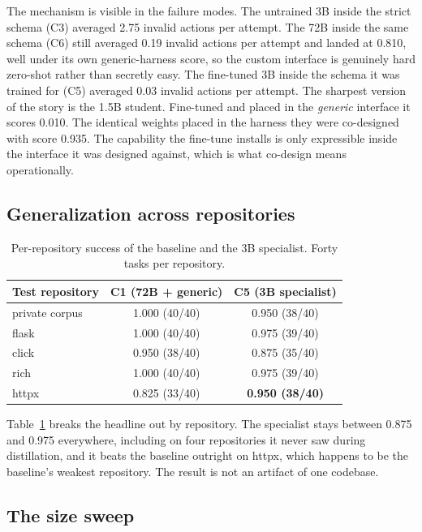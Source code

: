 \documentclass[11pt]{article}
\begin{document}
The mechanism is visible in the failure modes. The untrained 3B inside the
strict schema (C3) averaged 2.75 invalid actions per attempt. The 72B inside
the same schema (C6) still averaged 0.19 invalid actions per attempt and
landed at 0.810, well under its own generic-harness score, so the custom
interface is genuinely hard zero-shot rather than secretly easy. The
fine-tuned 3B inside the schema it was trained for (C5) averaged 0.03 invalid
actions per attempt. The sharpest version of the story is the 1.5B student.
Fine-tuned and placed in the \emph{generic} interface it scores 0.010.
The identical weights placed in the harness they were co-designed with score
0.935. The capability the fine-tune installs is only expressible inside the
interface it was designed against, which is what co-design means
operationally.

\subsection{Generalization across repositories}

\begin{table}[t]
  \centering
  \small
  \caption{Per-repository success of the baseline and the 3B specialist.
  Forty tasks per repository.}
  \label{tab:repos}
  \begin{tabular}{lcc}
    \toprule
    Test repository & C1 (72B + generic) & C5 (3B specialist) \\
    \midrule
    private corpus & 1.000 (40/40) & 0.950 (38/40) \\
    flask          & 1.000 (40/40) & 0.975 (39/40) \\
    click          & 0.950 (38/40) & 0.875 (35/40) \\
    rich           & 1.000 (40/40) & 0.975 (39/40) \\
    httpx          & 0.825 (33/40) & \textbf{0.950 (38/40)} \\
    \bottomrule
  \end{tabular}
\end{table}

Table~\ref{tab:repos} breaks the headline out by repository. The specialist
stays between 0.875 and 0.975 everywhere, including on four repositories it
never saw during distillation, and it beats the baseline outright on httpx,
which happens to be the baseline's weakest repository. The result is not an
artifact of one codebase.

\subsection{The size sweep}
\end{document}

